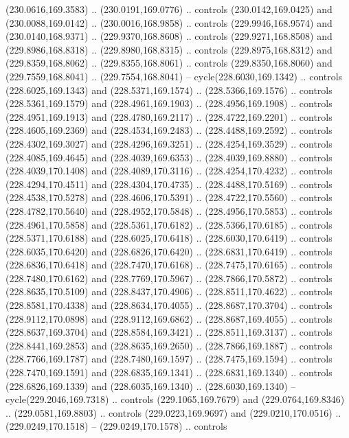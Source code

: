 \begin{scope}[cm={{1.25,0.0,0.0,-1.25,(0.0,442.91375)}}]
    (230.0616,169.3583) .. (230.0191,169.0776) .. controls (230.0142,169.0425) and
    (230.0088,169.0142) .. (230.0016,168.9858) .. controls (229.9946,168.9574) and
    (230.0140,168.9371) .. (229.9370,168.8608) .. controls (229.9271,168.8508) and
    (229.8986,168.8318) .. (229.8980,168.8315) .. controls (229.8975,168.8312) and
    (229.8359,168.8062) .. (229.8355,168.8061) .. controls (229.8350,168.8060) and
    (229.7559,168.8041) .. (229.7554,168.8041) -- cycle(228.6030,169.1342) ..
    controls (228.6025,169.1343) and (228.5371,169.1574) .. (228.5366,169.1576) ..
    controls (228.5361,169.1579) and (228.4961,169.1903) .. (228.4956,169.1908) ..
    controls (228.4951,169.1913) and (228.4780,169.2117) .. (228.4722,169.2201) ..
    controls (228.4605,169.2369) and (228.4534,169.2483) .. (228.4488,169.2592) ..
    controls (228.4302,169.3027) and (228.4296,169.3251) .. (228.4254,169.3529) ..
    controls (228.4085,169.4645) and (228.4039,169.6353) .. (228.4039,169.8880) ..
    controls (228.4039,170.1408) and (228.4089,170.3116) .. (228.4254,170.4232) ..
    controls (228.4294,170.4511) and (228.4304,170.4735) .. (228.4488,170.5169) ..
    controls (228.4538,170.5278) and (228.4606,170.5391) .. (228.4722,170.5560) ..
    controls (228.4782,170.5640) and (228.4952,170.5848) .. (228.4956,170.5853) ..
    controls (228.4961,170.5858) and (228.5361,170.6182) .. (228.5366,170.6185) ..
    controls (228.5371,170.6188) and (228.6025,170.6418) .. (228.6030,170.6419) ..
    controls (228.6035,170.6420) and (228.6826,170.6420) .. (228.6831,170.6419) ..
    controls (228.6836,170.6418) and (228.7470,170.6168) .. (228.7475,170.6165) ..
    controls (228.7480,170.6162) and (228.7769,170.5967) .. (228.7866,170.5872) ..
    controls (228.8635,170.5109) and (228.8437,170.4906) .. (228.8511,170.4622) ..
    controls (228.8581,170.4338) and (228.8634,170.4055) .. (228.8687,170.3704) ..
    controls (228.9112,170.0898) and (228.9112,169.6862) .. (228.8687,169.4055) ..
    controls (228.8637,169.3704) and (228.8584,169.3421) .. (228.8511,169.3137) ..
    controls (228.8441,169.2853) and (228.8635,169.2650) .. (228.7866,169.1887) ..
    controls (228.7766,169.1787) and (228.7480,169.1597) .. (228.7475,169.1594) ..
    controls (228.7470,169.1591) and (228.6835,169.1341) .. (228.6831,169.1340) ..
    controls (228.6826,169.1339) and (228.6035,169.1340) .. (228.6030,169.1340) --
    cycle(229.2046,169.7318) .. controls (229.1065,169.7679) and
    (229.0764,169.8346) .. (229.0581,169.8803) .. controls (229.0223,169.9697) and
    (229.0210,170.0516) .. (229.0249,170.1518) -- (229.0249,170.1578) .. controls

\end{scope}
